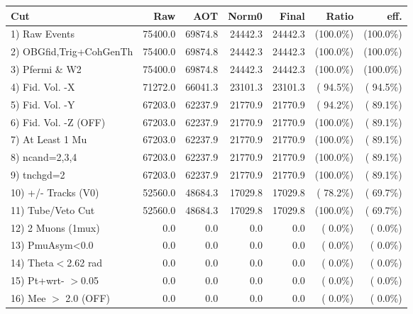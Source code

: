  \begin{table}[h!]\centering
 \begin{tabular}{||l||r|r|r|r|r|r||}
 \hline
 \hline
 Cut & Raw & AOT & Norm0 & Final & Ratio & eff.       \\
 \hline
  1) Raw Events           &      75400.0 &      69874.8 &      24442.3 &      24442.3 & (100.0\%) & (100.0\%) \\
  2) OBGfid,Trig+CohGenTh &      75400.0 &      69874.8 &      24442.3 &      24442.3 & (100.0\%) & (100.0\%) \\
  3) Pfermi \& W2         &      75400.0 &      69874.8 &      24442.3 &      24442.3 & (100.0\%) & (100.0\%) \\
  4) Fid. Vol. -X         &      71272.0 &      66041.3 &      23101.3 &      23101.3 & ( 94.5\%) & ( 94.5\%) \\
  5) Fid. Vol. -Y         &      67203.0 &      62237.9 &      21770.9 &      21770.9 & ( 94.2\%) & ( 89.1\%) \\
  6) Fid. Vol. -Z (OFF)   &      67203.0 &      62237.9 &      21770.9 &      21770.9 & (100.0\%) & ( 89.1\%) \\
  7) At Least 1 Mu        &      67203.0 &      62237.9 &      21770.9 &      21770.9 & (100.0\%) & ( 89.1\%) \\
  8) ncand=2,3,4          &      67203.0 &      62237.9 &      21770.9 &      21770.9 & (100.0\%) & ( 89.1\%) \\
  9) tnchgd=2             &      67203.0 &      62237.9 &      21770.9 &      21770.9 & (100.0\%) & ( 89.1\%) \\
 10) +/- Tracks (V0)      &      52560.0 &      48684.3 &      17029.8 &      17029.8 & ( 78.2\%) & ( 69.7\%) \\
 11) Tube/Veto Cut        &      52560.0 &      48684.3 &      17029.8 &      17029.8 & (100.0\%) & ( 69.7\%) \\
 12) 2 Muons (1mux)       &          0.0 &          0.0 &          0.0 &          0.0 & (  0.0\%) & (  0.0\%) \\
 13) PmuAsym<0.0          &          0.0 &          0.0 &          0.0 &          0.0 & (  0.0\%) & (  0.0\%) \\
 14) Theta$<$2.62 rad     &          0.0 &          0.0 &          0.0 &          0.0 & (  0.0\%) & (  0.0\%) \\
 15) Pt+wrt- $>$0.05      &          0.0 &          0.0 &          0.0 &          0.0 & (  0.0\%) & (  0.0\%) \\
 16) Mee $>$ 2.0  (OFF)   &          0.0 &          0.0 &          0.0 &          0.0 & (  0.0\%) & (  0.0\%) \\

\end{tabular}
\end{table}
